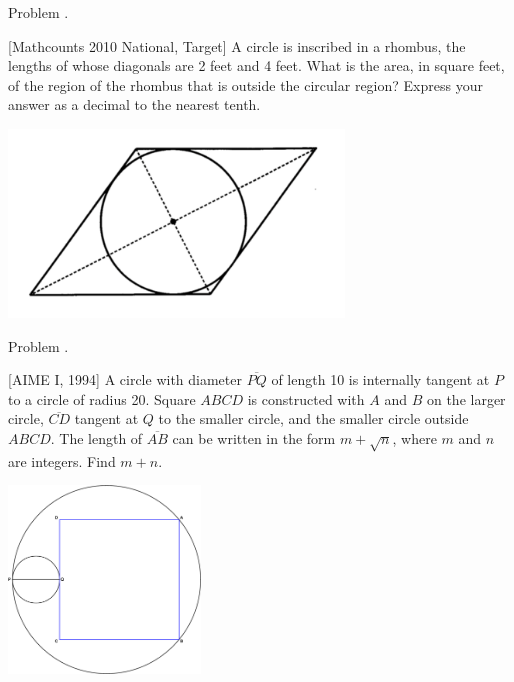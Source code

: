 \documentclass[9pt]{beamer}
\newcounter{problem}[section]
\begin{document}
\begin{frame}[t, fragile]{Problem \thesection.\theproblem}
    \begin{block}{}[Mathcounts 2010 National, Target]
    A circle is inscribed in a rhombus, the lengths of whose diagonals are 2 feet and 4 feet. What is the area, in square feet, of the region of the rhombus that is outside the circular region? Express your answer as a decimal to the nearest tenth.
    \end{block}
    \begin{center}
        \includegraphics[height=50mm,scale=0.25]{images/2010MC_Nat_T5.png}
    \end{center}
	

\end{frame}

\begin{frame}[t, fragile]{Problem \thesection.\theproblem}
    \begin{block}{}[AIME I, 1994]
    A circle with diameter $\overline{PQ}$ of length 10 is internally tangent at $P$ to a circle of radius 20. Square $ABCD$ is constructed with $A$ and $B$ on the larger circle, $\overline{CD}$ tangent at $Q$ to the smaller circle, and the smaller circle outside $ABCD$. The length of $\overline{AB}$ can be written in the form $m + \sqrt{n}$, where $m$ and $n$ are integers. Find $m + n$.
    \end{block}
    \begin{center}
        \includegraphics[height=50mm,scale=0.25]{images/1994_AIME_2.png}
    \end{center}
	

\end{frame}
\end{document}
